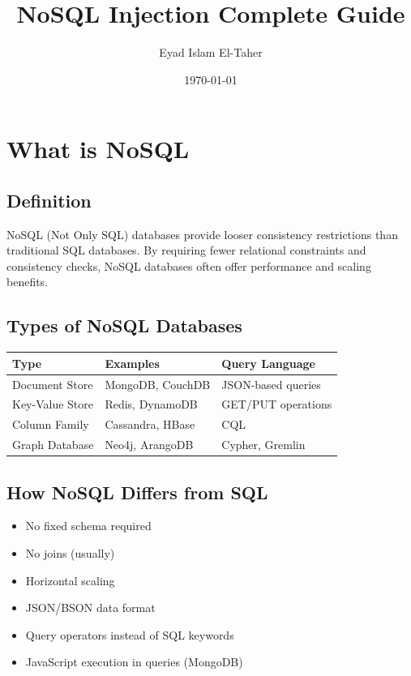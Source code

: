 \documentclass[12pt]{article}
\title{NoSQL Injection Complete Guide}
\author{Eyad Islam El-Taher}
\date{\today}
\begin{document}
\maketitle
\tableofcontents
\newpage

\section{What is NoSQL}

\subsection{Definition}

NoSQL (Not Only SQL) databases provide looser consistency restrictions than traditional SQL databases. By requiring fewer relational constraints and consistency checks, NoSQL databases often offer performance and scaling benefits.

\subsection{Types of NoSQL Databases}

\begin{longtable}{|l|l|l|}
\hline
\textbf{Type} & \textbf{Examples} & \textbf{Query Language} \\
\hline
Document Store & MongoDB, CouchDB & JSON-based queries \\
\hline
Key-Value Store & Redis, DynamoDB & GET/PUT operations \\
\hline
Column Family & Cassandra, HBase & CQL \\
\hline
Graph Database & Neo4j, ArangoDB & Cypher, Gremlin \\
\hline
\end{longtable}

\subsection{How NoSQL Differs from SQL}

\begin{itemize}
    \item No fixed schema required
    \item No joins (usually)
    \item Horizontal scaling
    \item JSON/BSON data format
    \item Query operators instead of SQL keywords
    \item JavaScript execution in queries (MongoDB)
\end{itemize}
\end{document}
